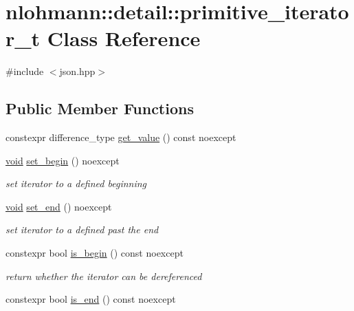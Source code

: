 \hypertarget{classnlohmann_1_1detail_1_1primitive__iterator__t}{}\section{nlohmann\+::detail\+::primitive\+\_\+iterator\+\_\+t Class Reference}
\label{classnlohmann_1_1detail_1_1primitive__iterator__t}


{\ttfamily \#include $<$json.\+hpp$>$}

\subsection*{Public Member Functions}
\begin{DoxyCompactItemize}
\item 
constexpr difference\+\_\+type \mbox{\hyperlink{classnlohmann_1_1detail_1_1primitive__iterator__t_ae952990886ca1756229f916661a8af81}{get\+\_\+value}} () const noexcept
\item 
\mbox{\hyperlink{namespacenlohmann_1_1detail_a59fca69799f6b9e366710cb9043aa77d}{void}} \mbox{\hyperlink{classnlohmann_1_1detail_1_1primitive__iterator__t_a9d9b005906106e12aed738f97d7fee42}{set\+\_\+begin}} () noexcept
\begin{DoxyCompactList}\small\item\em set iterator to a defined beginning \end{DoxyCompactList}\item 
\mbox{\hyperlink{namespacenlohmann_1_1detail_a59fca69799f6b9e366710cb9043aa77d}{void}} \mbox{\hyperlink{classnlohmann_1_1detail_1_1primitive__iterator__t_ad26a823483846a12d890c3feed3097eb}{set\+\_\+end}} () noexcept
\begin{DoxyCompactList}\small\item\em set iterator to a defined past the end \end{DoxyCompactList}\item 
constexpr bool \mbox{\hyperlink{classnlohmann_1_1detail_1_1primitive__iterator__t_a8d1a7d46b3fcd06edd034f04ededb5e4}{is\+\_\+begin}} () const noexcept
\begin{DoxyCompactList}\small\item\em return whether the iterator can be dereferenced \end{DoxyCompactList}\item 
constexpr bool \mbox{\hyperlink{classnlohmann_1_1detail_1_1primitive__iterator__t_a45a7e301c23b5b90417baf2277f40b1d}{is\+\_\+end}} () const noexcept

\end{DoxyCompactItemize}
